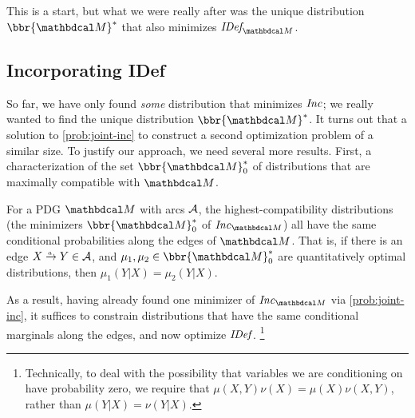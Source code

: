 \documentclass[twoside]{article}
\begin{document}
This is a start, but what we were really after was the unique distribution
$\bbr{\dg M}^*$ that also minimizes $\IDef{\dg M}$.

\subsection{Incorporating IDef}
    \label{sec:also-idef}

So far, we have only found \emph{some} distribution that minimizes $\mathit{Inc}$; 
we really wanted to find the unique distribution $\bbr{\dg M}^*$.
It turns out that a solution to \eqref{prob:joint-inc}  to construct a
second optimization problem of a similar size. 
To justify our approach, we need several more results.
First, a characterization of the set $\bbr{\dg M}^*_0$ of distributions that are maximally compatible with $\dg M$. 

\begin{prop}\label{prop:marginonly}
    For a PDG $\dg M$ with arcs $\cal A$,
	the highest-compatibility distributions (the minimizers $\bbr{\dg M}_0^*$ of $\Inc_{\dg M}$) all have the same conditional probabilities along the edges of $\dg M$.   
        	That is, if there is an edge $\ed aXY \in \Ar$, and
                $\mu_1, \mu_2 \in \bbr{\dg M}_0^*$ are quantitatively optimal
        distributions, then $\mu_1(Y|X) = \mu_2(Y|X)$.   
\end{prop}

As a result, having already found one minimizer of $\Inc_{\dg M}$ via \eqref{prob:joint-inc}, it suffices to constrain distributions that have the same conditional marginals along the edges, and now optimize $\mathit{IDef}_{\!}$.%
    \footnote{
        Technically, to deal with the possibility that variables we
                are conditioning on have probability zero,  
        we require that $\mu(X,Y)\nu(X) = \mu(X) \nu(X,Y)$, rather than 
        $\mu(Y|X) = \nu(Y|X)$.
    }
\end{document}
